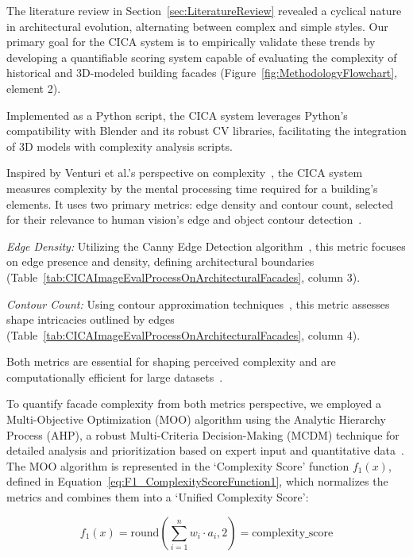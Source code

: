 
The literature review in Section~\ref{sec:LiteratureReview} revealed a cyclical nature in architectural evolution, alternating between complex and simple styles.
Our primary goal for the CICA system is to empirically validate these trends by developing a quantifiable scoring system capable of evaluating the complexity of historical and 3D-modeled building facades (Figure~\ref{fig:MethodologyFlowchart}, element 2).

Implemented as a Python script, the CICA system leverages Python's compatibility with Blender and its robust CV libraries, facilitating the integration of 3D models with complexity analysis scripts.

Inspired by Venturi et al.'s perspective on complexity~\cite{Venturi1977}, the CICA system measures complexity by the mental processing time required for a building's elements.
It uses two primary metrics: edge density and contour count, selected for their relevance to human vision's edge and object contour detection~\cite{Yang2022}.

\textit{Edge Density:} Utilizing the Canny Edge Detection algorithm~\cite{EdgeOpenCV2023}, this metric focuses on edge presence and density, defining architectural boundaries (Table~\ref{tab:CICAImageEvalProcessOnArchitecturalFacades}, column 3).

\textit{Contour Count:} Using contour approximation techniques~\cite{ContourOpenCV2023}, this metric assesses shape intricacies outlined by edges (Table~\ref{tab:CICAImageEvalProcessOnArchitecturalFacades}, column 4).

Both metrics are essential for shaping perceived complexity and are computationally efficient for large datasets~\cite{Yang2022}.

To quantify facade complexity from both metrics perspective, we employed a Multi-Objective Optimization (MOO) algorithm using the Analytic Hierarchy Process (AHP), a robust Multi-Criteria Decision-Making (MCDM) technique for detailed analysis and prioritization based on expert input and quantitative data~\cite{Taherdoost2023}.
The MOO algorithm is represented in the `Complexity Score' function \(f_1(x)\), defined in Equation~\ref{eq:F1_ComplexityScoreFunction1}, which normalizes the metrics and combines them into a `Unified Complexity Score':

\begin{equation}
    f_1(x) = \mathrm{round}\left(\sum_{i=1}^{n} w_i \cdot a_i, 2\right) = \text{complexity\_score}
    \label{eq:F1_ComplexityScoreFunction1}
\end{equation}

